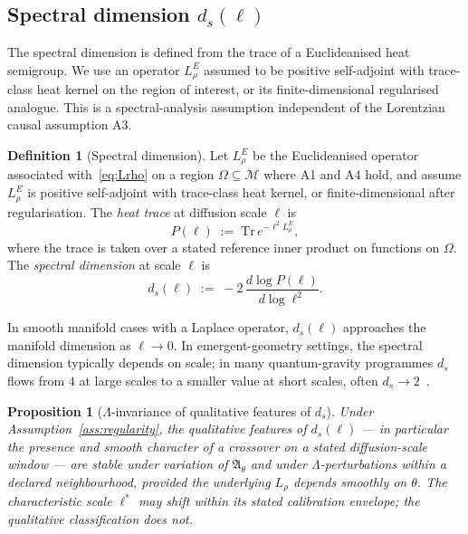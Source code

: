 ﻿\documentclass[12pt,a4paper]{article}
\newtheorem{proposition}[theorem]{Proposition}
\theoremstyle{definition}
\newtheorem{definition}[theorem]{Definition}
\begin{document}
\subsection[Spectral dimension ds(ell)]{Spectral dimension $d_s(\ell)$}
\label{sec:spectral_dimension}

The spectral dimension is defined from the trace of a Euclideanised heat semigroup. We use an operator $L_\rho^{E}$ assumed to be positive self-adjoint with trace-class heat kernel on the region of interest, or its finite-dimensional regularised analogue. This is a spectral-analysis assumption independent of the Lorentzian causal assumption A3.

\begin{definition}[Spectral dimension]
\label{def:ds}
Let $L_\rho^{E}$ be the Euclideanised operator associated with~\eqref{eq:Lrho} on a region $\Omega \subseteq \mathcal{M}$ where A1 and A4 hold, and assume $L_\rho^{E}$ is positive self-adjoint with trace-class heat kernel, or finite-dimensional after regularisation. The \emph{heat trace} at diffusion scale $\ell$ is
\begin{equation}
P(\ell) \;:=\; \mathrm{Tr}\, e^{-\ell^2 L_\rho^{E}},
\end{equation}
where the trace is taken over a stated reference inner product on functions on $\Omega$. The \emph{spectral dimension} at scale $\ell$ is
\begin{equation}
d_s(\ell) \;:=\; -2 \, \frac{d \log P(\ell)}{d \log \ell^2}.
\end{equation}
\end{definition}

In smooth manifold cases with a Laplace operator, $d_s(\ell)$ approaches the manifold dimension as $\ell \to 0$. In emergent-geometry settings, the spectral dimension typically depends on scale; in many quantum-gravity programmes $d_s$ flows from $4$ at large scales to a smaller value at short scales, often $d_s \to 2$~\citep{carlip,modesto}.

\begin{proposition}[$\Lambda$-invariance of qualitative features of $d_s$]
\label{prop:ds_invariance}
Under Assumption~\ref{ass:regularity}, the qualitative features of $d_s(\ell)$ --- in particular the presence and smooth character of a crossover on a stated diffusion-scale window --- are stable under variation of $\mathfrak{A}_\theta$ and under $\Lambda$-perturbations within a declared neighbourhood, provided the underlying $L_\rho$ depends smoothly on $\theta$. The characteristic scale $\ell^\ast$ may shift within its stated calibration envelope; the qualitative classification does not.
\end{proposition}
\end{document}

